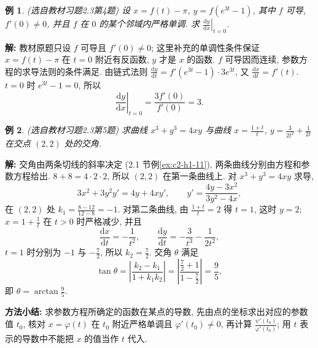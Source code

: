 \documentclass[UTF8,openany]{ctexbook}
\theoremstyle{chinesetextbook}
\newtheorem{example}{例}[section]
\newenvironment{cnsolution}{\par\indent\textbf{解:} \ignorespaces}{\par}
\newcommand{\dd}{\mathrm d}
\begin{document}
\begin{example}\label{ex:c2-h3-4}
\textnormal{(选自教材习题2.3第4题)} 设 $x=f(t)-\pi$, $y=f\left(e^{3t}-1\right)$, 其中 $f$ 可导, $f'(0)\ne0$, 并且 $f$ 在 $0$ 的某个邻域内严格单调. 求 $\displaystyle\left.\frac{\dd y}{\dd x}\right|_{t=0}$.
\end{example}
\begin{cnsolution}
教材原题只设 $f$ 可导且 $f'(0)\ne0$; 这里补充的单调性条件保证 $x=f(t)-\pi$ 在 $t=0$ 附近有反函数, $y$ 才是 $x$ 的函数. $f$ 可导因而连续, 参数方程的求导法则的条件满足. 由链式法则 $\displaystyle\frac{\dd y}{\dd t}=f'\left(e^{3t}-1\right)\cdot3e^{3t}$, 又 $\displaystyle\frac{\dd x}{\dd t}=f'(t)$. $t=0$ 时 $e^{3t}-1=0$, 所以
\[
\left.\frac{\dd y}{\dd x}\right|_{t=0}=\frac{3f'(0)}{f'(0)}=3.
\]
\end{cnsolution}
\begin{example}\label{ex:c2-h3-5}
\textnormal{(选自教材习题2.3第5题)} 求曲线 $x^3+y^3=4xy$ 与曲线 $\displaystyle x=\frac{1+t}t$, $\displaystyle y=\frac3{2t^2}+\frac1{2t}$ 在交点 $(2,2)$ 处的交角.
\end{example}
\begin{cnsolution}
交角由两条切线的斜率决定 (2.1 节例\ref{ex:c2-h1-11}), 两条曲线分别由方程和参数方程给出. $8+8=4\cdot2\cdot2$, 所以 $(2,2)$ 在第一条曲线上. 对 $x^3+y^3=4xy$ 求导,
\[
3x^2+3y^2y'=4y+4xy',\qquad y'=\frac{4y-3x^2}{3y^2-4x},
\]
在 $(2,2)$ 处 $\displaystyle k_1=\frac{8-12}{12-8}=-1$. 对第二条曲线, 由 $\displaystyle\frac{1+t}t=2$ 得 $t=1$, 这时 $y=2$; $\displaystyle x=1+\frac1t$ 在 $t>0$ 时严格减少, 并且
\[
\frac{\dd x}{\dd t}=-\frac1{t^2},\qquad\frac{\dd y}{\dd t}=-\frac3{t^3}-\frac1{2t^2},
\]
$t=1$ 时分别为 $-1$ 与 $\displaystyle-\frac72$, 所以 $\displaystyle k_2=\frac72$. 交角 $\theta$ 满足
\[
\tan\theta=\left|\frac{k_2-k_1}{1+k_1k_2}\right|=\left|\frac{\frac72+1}{1-\frac72}\right|=\frac95,
\]
即 $\displaystyle\theta=\arctan\frac95$.
\end{cnsolution}
\par\indent\textbf{方法小结:} 求参数方程所确定的函数在某点的导数, 先由点的坐标求出对应的参数值 $t_0$, 核对 $x=\varphi(t)$ 在 $t_0$ 附近严格单调且 $\varphi'(t_0)\ne0$, 再计算 $\displaystyle\frac{\psi'(t_0)}{\varphi'(t_0)}$; 用 $t$ 表示的导数中不能把 $x$ 的值当作 $t$ 代入.
\end{document}

